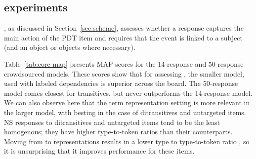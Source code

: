 \subsection{ experiments}
\label{sec:map-core}
, as discussed in Section~\ref{sec:scheme}, assesses whether a response captures the main action of the PDT item and requires that the event is linked to a subject (and an object or objects where necessary).

Table~\ref{tab:core-map} presents  MAP scores for the 14-response and 50-response crowdsourced models. These scores show that for assessing , the smaller model, used with labeled dependencies is superior across the board. The 50-response model comes closest for transitives, but never outperforms the 14-response model. We can also observe here that the term representation setting is more relevant in the larger model, with  besting  in the case of ditransitives and untargeted items. NS responses to ditransitives and untargeted items tend to  be the least homogenous; they have higher type-to-token ratios  than their counterparts. Moving from  to  representations results in a lower type to type-to-token ratio , so it is unsurprising that it improves performance for these items.

